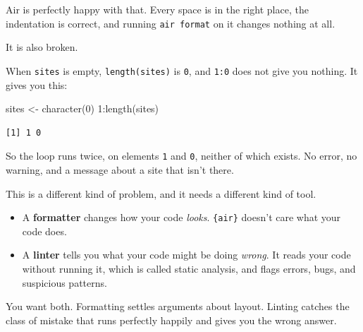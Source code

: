 \documentclass[
  letterpaper,
  justified,
  a4paper]{tufte-book}
\makeatletter
\newenvironment{Shaded}{\begin{snugshade}}{\end{snugshade}}
\newcommand{\DecValTok}[1]{\textcolor[rgb]{0.68,0.00,0.00}{#1}}
\newcommand{\FunctionTok}[1]{\textcolor[rgb]{0.28,0.35,0.67}{#1}}
\newcommand{\NormalTok}[1]{\textcolor[rgb]{0.00,0.23,0.31}{#1}}
\newcommand{\OtherTok}[1]{\textcolor[rgb]{0.00,0.23,0.31}{#1}}
\newcommand{\SpecialCharTok}[1]{\textcolor[rgb]{0.37,0.37,0.37}{#1}}
\providecommand{\tightlist}{%
  \setlength{\itemsep}{0pt}\setlength{\parskip}{0pt}}
\providecommand{\tightlist}{%
  \setlength{\itemsep}{0pt}\setlength{\parskip}{0pt}}
\let\rbporigShaded\Shaded
\let\rbporigendShaded\endShaded
\renewenvironment{Shaded}{%
  \begingroup
  \ifdim\linewidth=\rbpbodywidth
    \advance\linewidth by \@tufte@overhang
    \advance\hsize by \@tufte@overhang
    \advance\columnwidth by \@tufte@overhang
  \fi
  \rbporigShaded
}{%
  \rbporigendShaded
  \endgroup
}
\makeatother
\begin{document}
Air is perfectly happy with that. Every space is in the right place, the
indentation is correct, and running \texttt{air\ format} on it changes
nothing at all.

It is also broken.

When \texttt{sites} is empty, \texttt{length(sites)} is \texttt{0}, and
\texttt{1:0} does not give you nothing. It gives you this:

\begin{Shaded}
\begin{Highlighting}[]
\NormalTok{sites }\OtherTok{\textless{}{-}} \FunctionTok{character}\NormalTok{(}\DecValTok{0}\NormalTok{)}
\DecValTok{1}\SpecialCharTok{:}\FunctionTok{length}\NormalTok{(sites)}
\end{Highlighting}
\end{Shaded}

\begin{verbatim}
[1] 1 0
\end{verbatim}

So the loop runs twice, on elements \texttt{1} and \texttt{0}, neither
of which exists. No error, no warning, and a message about a site that
isn't there.

This is a different kind of problem, and it needs a different kind of
tool.

\begin{itemize}
\tightlist
\item
  A \textbf{formatter} changes how your code \emph{looks}.
  \texttt{\{air\}} doesn't care what your code does.
\item
  A \textbf{linter} tells you what your code might be doing
  \emph{wrong}. It reads your code without running it, which is called
  static analysis, and flags errors, bugs, and suspicious patterns.
\end{itemize}

You want both. Formatting settles arguments about layout. Linting
catches the class of mistake that runs perfectly happily and gives you
the wrong answer.
\end{document}
